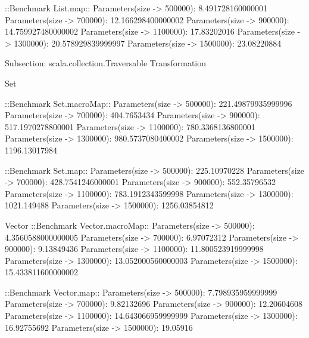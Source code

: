::Benchmark List.map::
Parameters(size -> 500000): 8.491728160000001
Parameters(size -> 700000): 12.166298400000002
Parameters(size -> 900000): 14.759927480000002
Parameters(size -> 1100000): 17.83202016
Parameters(size -> 1300000): 20.578929839999997
Parameters(size -> 1500000): 23.08220884


Subsection: scala.collection.Traversable Transformation

Set

::Benchmark Set.macroMap::
Parameters(size -> 500000): 221.49879935999996
Parameters(size -> 700000): 404.7653434
Parameters(size -> 900000): 517.1970278800001
Parameters(size -> 1100000): 780.3368136800001
Parameters(size -> 1300000): 980.5737080400002
Parameters(size -> 1500000): 1196.13017984

::Benchmark Set.map::
Parameters(size -> 500000): 225.10970228
Parameters(size -> 700000): 428.7541246000001
Parameters(size -> 900000): 552.35796532
Parameters(size -> 1100000): 783.1912343599998
Parameters(size -> 1300000): 1021.149488
Parameters(size -> 1500000): 1256.03854812


Vector
::Benchmark Vector.macroMap::
Parameters(size -> 500000): 4.3560588000000005
Parameters(size -> 700000): 6.97072312
Parameters(size -> 900000): 9.13849436
Parameters(size -> 1100000): 11.800523919999998
Parameters(size -> 1300000): 13.052000560000003
Parameters(size -> 1500000): 15.433811600000002

::Benchmark Vector.map::
Parameters(size -> 500000): 7.798935959999999
Parameters(size -> 700000): 9.82132696
Parameters(size -> 900000): 12.20604608
Parameters(size -> 1100000): 14.643066959999999
Parameters(size -> 1300000): 16.92755692
Parameters(size -> 1500000): 19.05916

